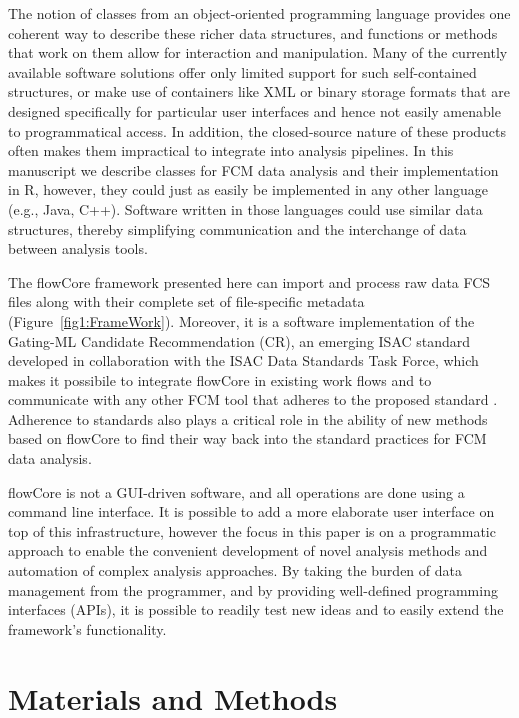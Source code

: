 \documentclass[12pt]{article}
\newcommand{\Rpackage}[1]{{\textsf{#1}}}
\begin{document}
The notion of classes from an object-oriented programming language
provides one coherent way to describe these richer data structures,
and functions or methods that work on them allow for interaction and
manipulation. Many of the currently available software solutions offer
only limited support for such self-contained structures, or make use
of containers like XML or binary storage formats that are designed
specifically for particular user interfaces and hence not easily
amenable to programmatical access. In addition, the closed-source
nature of these products often makes them impractical to integrate
into analysis pipelines. In this manuscript we describe classes for
FCM data analysis and their implementation in R, however, they could
just as easily be implemented in any other language (e.g., Java,
C++). Software written in those languages could use similar data
structures, thereby simplifying communication and the interchange of
data between analysis tools.

The \Rpackage{flowCore} framework presented here can import and
process raw data FCS files along with their complete set of
file-specific metadata (Figure~\ref{fig1:FrameWork}).  Moreover, it is
a software implementation of the Gating-ML Candidate Recommendation
(CR), an emerging ISAC standard developed in collaboration with the
ISAC Data Standards Task Force, which makes it possibile to integrate
\Rpackage{flowCore} in existing work flows and to communicate with any
other FCM tool that adheres to the proposed standard
\citep{SpidlenInPressCytometryA}. Adherence to standards also plays a
critical role in the ability of new methods based on
\Rpackage{flowCore} to find their way back into the standard practices
for FCM data analysis.

\Rpackage{flowCore} is not a GUI-driven software, and all operations
are done using a command line interface.  It is possible to add a more
elaborate user interface on top of this infrastructure, however the
focus in this paper is on a programmatic approach to enable the
convenient development of novel analysis methods and automation of
complex analysis approaches.  By taking the burden of data management
from the programmer, and by providing well-defined programming
interfaces (APIs), it is possible to readily test new ideas and to
easily extend the framework's functionality.



\section*{Materials and Methods}
\end{document}
